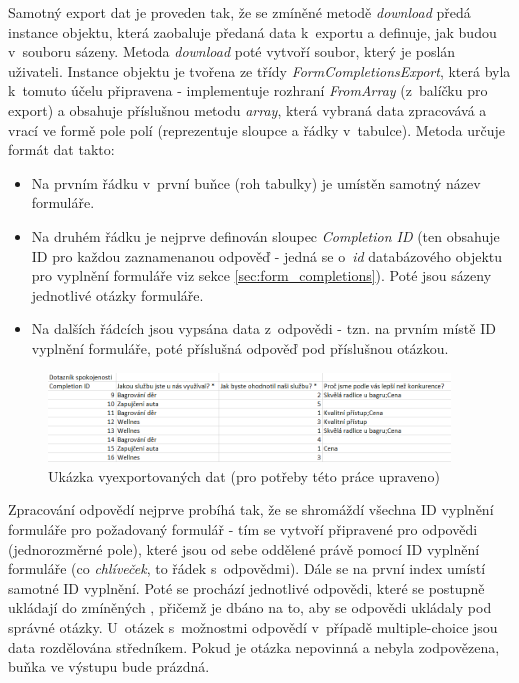 			Samotný export dat je proveden tak, že se zmíněné metodě \textit{download} předá instance objektu, která zaobaluje předaná data k~exportu a definuje, jak budou v~souboru sázeny. Metoda \textit{download} poté vytvoří soubor, který je poslán uživateli. Instance objektu je tvořena ze třídy \textit{FormCompletionsExport}, která byla k~tomuto účelu připravena - implementuje rozhraní \textit{FromArray} (z~balíčku pro export) a obsahuje příslušnou metodu \textit{array}, která vybraná data zpracovává a vrací ve formě pole polí (reprezentuje sloupce a řádky v~tabulce). Metoda určuje formát dat takto:
			
			\begin{itemize}
				\item Na prvním řádku v~první buňce (roh tabulky) je umístěn samotný název formuláře.
				\item Na druhém řádku je nejprve definován sloupec \textit{Completion ID} (ten obsahuje ID pro každou zaznamenanou odpověď - jedná se o~\textit{id} databázového objektu pro vyplnění formuláře viz sekce \ref{sec:form_completions}). Poté jsou sázeny jednotlivé otázky formuláře.
				\item Na dalších řádcích jsou vypsána data z~odpovědi - tzn. na prvním místě ID vyplnění formuláře, poté příslušná odpověď pod příslušnou otázkou.
			\end{itemize}
		
			\begin{figure}[h]
				\centering
				\includegraphics[width=0.95\textwidth]{img/export_excel.png}
				\caption{Ukázka vyexportovaných dat (pro potřeby této práce upraveno)}
				\label{fig:export_excel}
			\end{figure}
		
			Zpracování odpovědí nejprve probíhá tak, že se shromáždí všechna ID vyplnění formuláře pro požadovaný formulář - tím se vytvoří připravené  pro odpovědi (jednorozměrné pole), které jsou od sebe oddělené právě pomocí ID vyplnění formuláře (co \textit{chlíveček}, to řádek s~odpovědmi). Dále se na první index  umístí samotné ID vyplnění. Poté se prochází jednotlivé odpovědi, které se postupně ukládají do zmíněných , přičemž je dbáno na to, aby se odpovědi ukládaly pod správné otázky. U~otázek s~možnostmi odpovědí v~případě multiple-choice jsou data rozdělována středníkem. Pokud je otázka nepovinná a nebyla zodpovězena, buňka ve výstupu bude prázdná. 
			
